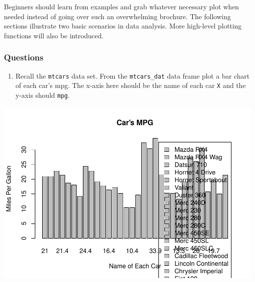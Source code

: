 \documentclass[
]{article}
\newenvironment{Shaded}{\begin{snugshade}}{\end{snugshade}}
\newcommand{\DataTypeTok}[1]{\textcolor[rgb]{0.13,0.29,0.53}{#1}}
\newcommand{\KeywordTok}[1]{\textcolor[rgb]{0.13,0.29,0.53}{\textbf{#1}}}
\newcommand{\NormalTok}[1]{#1}
\newcommand{\OperatorTok}[1]{\textcolor[rgb]{0.81,0.36,0.00}{\textbf{#1}}}
\newcommand{\OtherTok}[1]{\textcolor[rgb]{0.56,0.35,0.01}{#1}}
\newcommand{\StringTok}[1]{\textcolor[rgb]{0.31,0.60,0.02}{#1}}
\providecommand{\tightlist}{%
  \setlength{\itemsep}{0pt}\setlength{\parskip}{0pt}}
\begin{document}
Beginners should learn from examples and grab whatever necessary plot
when needed instead of going over such an overwhelming brochure. The
following sections illustrate two basic scenarios in data analysis. More
high-level plotting functions will also be introduced.

\hypertarget{questions-1}{%
\subsubsection{Questions}\label{questions-1}}

\begin{enumerate}
\def\labelenumi{\arabic{enumi}.}
\tightlist
\item
  Recall the \texttt{mtcars} data set. From the \texttt{mtcars\_dat}
  data frame plot a bar chart of each car's mpg. The x-axis here should
  be the name of each car \texttt{X} and the y-axis should \texttt{mpg}.
\end{enumerate}

\begin{Shaded}
\end{Shaded}

\includegraphics{CA2_DataAnalysis_files/figure-latex/unnamed-chunk-6-1.pdf}
\end{document}
